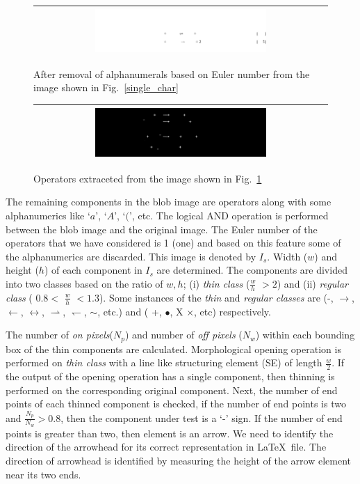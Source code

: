 \documentclass[oneside,a4paper,12pt]{book}
\begin{document}
\begin{figure}[h]\center\footnotesize
\begin{tabular}{|c|}\hline
 \includegraphics[width=0.6\textwidth]{singleCharafterEuler.png} \\\hline
 \end{tabular} 
 \caption{After removal of alphanumerals based on Euler number from the image shown
in Fig.~\ref{single_char}}
 \label{after_euler}
\end{figure}

\begin{figure}[h]\center\footnotesize
\begin{tabular}{|c|}\hline
 \includegraphics[width=0.6\textwidth]{operator.png} \\\hline
 \end{tabular} 
 \caption{Operators extraceted from the image shown in Fig.~\ref{after_euler}}
 \label{operator}
\end{figure}

The remaining components in the blob image are operators along with some alphanumerics like $‘a’$, $‘A’$, $‘(’$, etc. The logical AND operation is performed between the blob image and the original image. The Euler number of the operators that we have considered is 1 (one) and based on this feature some of the alphanumerics are discarded. This image is denoted by $I_s$.
Width ($w$) and height ($h$) of each component in $I_s$ are determined. The components  are divided into two classes based on the ratio of $w, h$;
(i) {\em thin class} ($\frac{w}{h}$ $> 2$) and (ii) {\em regular class} ( $0.8 <$ $\frac{w}{h}$ $< 1.3$). 
Some instances of the \emph{thin}  and \emph{regular classes} are (-,  $\rightarrow$, $\leftarrow$, $\leftrightarrow$,  $\rightharpoonup$, $\leftharpoondown$, $\sim$, etc.) and  ( +, $\bullet$, X $\times$, etc) respectively. 

The number of \emph{on pixels}($N_p$) and number of \emph{off pixels} ($N_w$) within each bounding box of the thin components are calculated. 
Morphological opening operation is performed on {\em thin class} with a line like structuring element (SE) of length $\frac{w}{2}$.
If the output of the opening operation has a single component, then  thinning is performed on the corresponding original component.
Next, the number of end points of each thinned component is checked, if the number of end points is two  and $\frac{N_p}{N_w} > 0.8$, then the component under test is a `-' sign. If the number of end points is greater than two, then  element is an arrow. We need to identify the direction of the arrowhead for its correct representation in  \LaTeX\ file. The direction of arrowhead is identified by measuring the height of the arrow element near its two ends. 
\end{document}

